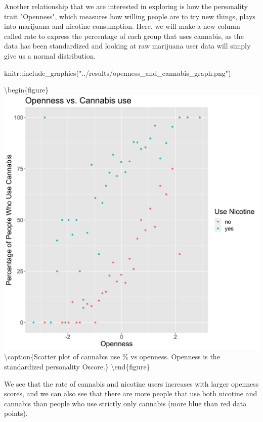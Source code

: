 \documentclass[
]{article}
\newenvironment{Shaded}{\begin{snugshade}}{\end{snugshade}}
\newcommand{\FunctionTok}[1]{\textcolor[rgb]{0.00,0.00,0.00}{#1}}
\newcommand{\NormalTok}[1]{#1}
\newcommand{\SpecialCharTok}[1]{\textcolor[rgb]{0.00,0.00,0.00}{#1}}
\newcommand{\StringTok}[1]{\textcolor[rgb]{0.31,0.60,0.02}{#1}}
\begin{document}
Another relationship that we are interested in exploring is how the
personality trait "Openness", which measures how willing people are to
try new things, plays into marijuana and nicotine consumption. Here, we
will make a new column called rate to express the percentage of each
group that uses cannabis, as the data has been standardized and looking
at raw marijuana user data will simply give us a normal distribution.

\begin{Shaded}
\begin{Highlighting}[]
\NormalTok{knitr}\SpecialCharTok{::}\FunctionTok{include\_graphics}\NormalTok{(}\StringTok{"../results/openness\_and\_cannabis\_graph.png"}\NormalTok{)}
\end{Highlighting}
\end{Shaded}

\textbackslash begin\{figure\}
\includegraphics[width=0.5\linewidth,height=0.5\textheight]{../results/openness_and_cannabis_graph} \textbackslash caption\{Scatter plot of cannabis use \% vs openness. Openness is the standardized personality Oscore.\}\label{fig:cannabis-graph}
\textbackslash end\{figure\}

We see that the rate of cannabis and nicotine users increases with
larger openness scores, and we can also see that there are more people
that use both nicotine and cannabis than people who use strictly only
cannabis (more blue than red data points).
\end{document}
